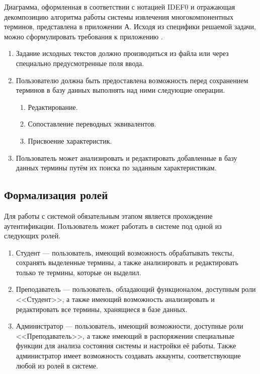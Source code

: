 Диаграмма, оформленная в соответствии с нотацией IDEF0 и отражающая декомпозицию алгоритма работы системы извлечения многокомпонентных терминов, представлена в приложении А. Исходя из специфики решаемой задачи, можно сформулировать требования к приложению \cite{My_article_2022}.


\begin{enumerate}[label*=\arabic*.]
	\item Задание исходных текстов должно производиться из файла или через специально предусмотренные поля ввода.
	\item Пользователю должна быть предоставлена возможность перед сохранением терминов в базу данных выполнять над ними следующие операции.
	
	\begin{enumerate}[label*=\arabic*.]
		\item Редактирование.
		\item Сопоставление переводных эквивалентов.
		\item Присвоение характеристик.
		
	\end{enumerate}

	\item Пользователь может анализировать и редактировать добавленные в базу данных термины путём их поиска по заданным характеристикам.
	
\end{enumerate}



\subsection{Формализация ролей}

Для работы с системой обязательным этапом является прохождение аутентификации. Пользователь может работать в системе под одной из следующих ролей.

\begin{enumerate}[label*=\arabic*.]
	\item Студент --- пользователь, имеющий возможность обрабатывать тексты, сохранять выделенные термины, а также анализировать и редактировать только те термины, которые он выделил.
	\item Преподаватель --- пользователь, обладающий функционалом, доступным роли <<Студент>>, а также имеющий возможность анализировать и редактировать все термины, хранящиеся в базе данных.
	\item Администратор --- пользователь, имеющий возможности, доступные роли <<Преподаватель>>, а также имеющий в распоряжении специальные функции для анализа состояния системы и настройки её работы. Также администратор имеет возможность создавать аккаунты, соответствующие любой из ролей в системе.
	
\end{enumerate}

